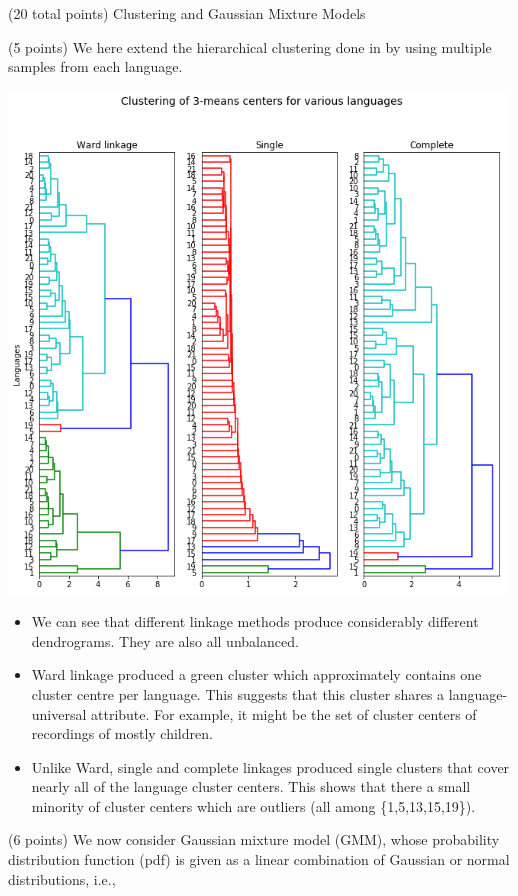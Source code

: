 \documentclass[12pt]{article}
\begin{document}
\begin{question}{(20 total points) Clustering and Gaussian Mixture Models}
\begin{subquestion}{(5 points)
       We here extend the hierarchical clustering done in  by
       using multiple samples from each language.
     }
   

      \begin{answerbox}{50em}
                  \begin{center}
	\includegraphics[width=0.99\textwidth]{imgs/3_4.png}
	\end{center}
	\begin{itemize}
	\itemsep -3pt {}
	\item We can see that different linkage methods produce considerably different dendrograms. They are also all unbalanced.
	\item Ward linkage produced a green cluster which approximately contains one cluster centre per language. This suggests that this cluster shares a language-universal attribute. For example, it might be the set of cluster centers of recordings of mostly children.
	\item Unlike Ward, single and complete linkages produced single clusters that cover nearly all of the language cluster centers. This shows that there a small minority of cluster centers which are outliers (all among \{1,5,13,15,19\}).
	\end{itemize}
      \end{answerbox}
  


   \end{subquestion}
   \begin{subquestion}{(6 points)
       We now consider Gaussian mixture model (GMM), whose
       probability distribution function (pdf) is given as
       a linear combination of Gaussian or normal distributions, i.e.,
     } \label{Q3.5}





\end{subquestion}
\end{question}
\end{document}
